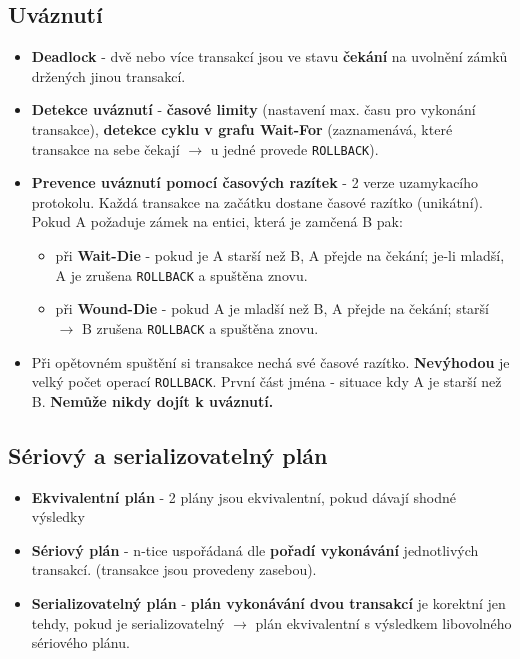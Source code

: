 \subsection{Uváznutí}
\begin{itemize}
\item \textbf{Deadlock} - dvě nebo více transakcí jsou ve stavu \textbf{čekání} na uvolnění zámků držených jinou transakcí.
\item \textbf{Detekce uváznutí} - \textbf{časové limity} (nastavení max. času pro vykonání transakce), \textbf{detekce cyklu v grafu Wait-For} (zaznamenává, které transakce na sebe čekají $\rightarrow$ u jedné provede \texttt{ROLLBACK}).
\item \textbf{Prevence uváznutí pomocí časových razítek} - 2 verze uzamykacího protokolu. Každá transakce na začátku dostane časové razítko (unikátní). Pokud A požaduje zámek na entici, která je zamčená B pak:
\begin{itemize}
\item při \textbf{Wait-Die} - pokud je A starší než B, A přejde na čekání; je-li mladší, A je zrušena \texttt{ROLLBACK} a spuštěna znovu.
\item při \textbf{Wound-Die} - pokud A je mladší než B, A přejde na čekání; starší $\rightarrow$ B zrušena \texttt{ROLLBACK} a spuštěna znovu.
\end{itemize}
\item Při opětovném spuštění si transakce nechá své časové razítko. \textbf{Nevýhodou} je velký počet operací \texttt{ROLLBACK}. První část jména - situace kdy A je starší než B. \textbf{Nemůže nikdy dojít k uváznutí.}
\end{itemize}

\subsection{Sériový a serializovatelný plán}
\begin{itemize}
\item \textbf{Ekvivalentní plán} - 2 plány jsou ekvivalentní, pokud dávají shodné výsledky
\item \textbf{Sériový plán} - n-tice uspořádaná dle \textbf{pořadí vykonávání} jednotlivých transakcí. (transakce jsou provedeny zasebou).
\item \textbf{Serializovatelný plán} - \textbf{plán vykonávání dvou transakcí} je korektní jen tehdy, pokud je serializovatelný $\rightarrow$ plán ekvivalentní s výsledkem libovolného sériového plánu.
\end{itemize}

